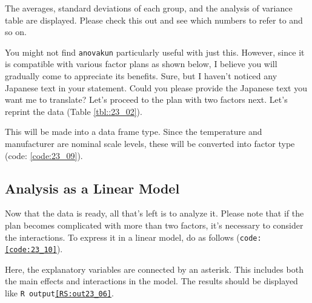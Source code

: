 \documentclass{ltjbook}
\begin{document}

The averages, standard deviations of each group, and the analysis of variance table are displayed. Please check this out and see which numbers to refer to and so on.

You might not find \texttt{anovakun} particularly useful with just this. However, since it is compatible with various factor plans as shown below, I believe you will gradually come to appreciate its benefits.
Sure, but I haven't noticed any Japanese text in your statement. Could you please provide the Japanese text you want me to translate?
Let's proceed to the plan with two factors next. Let's reprint the data (Table \ref{tbl::23_02}).

This will be made into a data frame type. Since the temperature and manufacturer are nominal scale levels, these will be converted into factor type (code: \ref{code:23_09}).

\subsection{Analysis as a Linear Model}
Now that the data is ready, all that's left is to analyze it. Please note that if the plan becomes complicated with more than two factors, it's necessary to consider the interactions. To express it in a linear model, do as follows (\texttt{code:\ref{code:23_10}}).

Here, the explanatory variables are connected by an asterisk. This includes both the main effects and interactions in the model. The results should be displayed like \texttt{R output\ref{RS:out23_06}}.
\end{document}
